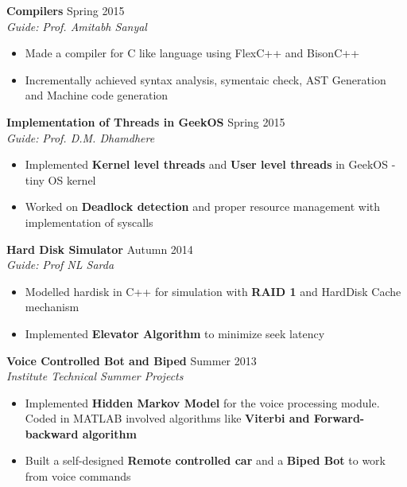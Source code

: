 \documentclass[11pt]{article} %
\begin{document}
\noindent \textbf{Compilers} \hfill Spring 2015 \vspace{-0.5mm}\\
\textit{Guide:} \textit{Prof. Amitabh Sanyal}
\vspace{-4mm}
\begin{itemize}
\itemsep-0.4em
\item Made a compiler for C like language using FlexC++ and BisonC++
\item Incrementally achieved syntax analysis, symentaic check, AST Generation and Machine code generation
\end{itemize}
\vspace{-3mm}


\noindent \textbf{Implementation of Threads in GeekOS} \hfill Spring 2015 \vspace{-0.5mm}\\
\textit{Guide:} \textit{Prof. D.M. Dhamdhere}
\vspace{-4mm}
\begin{itemize}
\itemsep-0.4em
\item Implemented \textbf{Kernel level threads} and \textbf{User level threads} in GeekOS - tiny OS kernel
\item Worked on \textbf{Deadlock detection} and proper resource management with implementation of syscalls
\end{itemize}
\vspace{-3mm}

\noindent \textbf{Hard Disk Simulator} \hfill Autumn 2014 \vspace{-0.5mm}\\
\textit{Guide:} \textit{Prof NL Sarda}
\vspace{-4mm}
\begin{itemize}
\itemsep-0.4em
\item Modelled hardisk in C++ for simulation with \textbf{RAID 1} and HardDisk Cache mechanism
\item Implemented \textbf{Elevator Algorithm}  to minimize seek latency
\end{itemize}
\vspace{-3mm}

\noindent \textbf{Voice Controlled Bot and Biped} \hfill Summer 2013 \vspace{-0.5mm}\\
\textit{Institute Technical Summer Projects}
\vspace{-4mm}
\begin{itemize}
\itemsep-0.4em
\item Implemented \textbf{Hidden Markov Model} for the voice processing module. Coded in MATLAB involved algorithms like \textbf{Viterbi and Forward-backward algorithm}
\item Built a self-designed \textbf{Remote controlled car} and a \textbf{Biped Bot} to work from voice commands
\end{itemize}
\vspace{-3mm}
\end{document}
